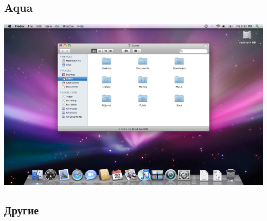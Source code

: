 \subsection{Aqua}\label{base:software:de:aqua}
\includegraphics[scale=0.4]{base/Software/Aqua.png}
\subsection{Другие}\label{base:software:de:others}
